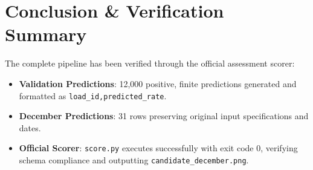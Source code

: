 \documentclass[11pt,a4paper]{article}
\begin{document}
\section{Conclusion \& Verification Summary}
The complete pipeline has been verified through the official assessment scorer:
\begin{itemize}
    \item \textbf{Validation Predictions}: 12,000 positive, finite predictions generated and formatted as \texttt{load\_id,predicted\_rate}.
    \item \textbf{December Predictions}: 31 rows preserving original input specifications and dates.
    \item \textbf{Official Scorer}: \texttt{score.py} executes successfully with exit code 0, verifying schema compliance and outputting \texttt{candidate\_december.png}.
\end{itemize}
\end{document}
